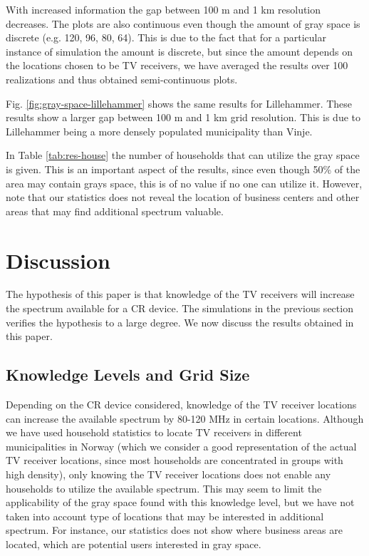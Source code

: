 \documentclass[journal,11pt,draftclsnofoot,onecolumn]{IEEEtran}
\begin{document}
With increased information the gap between 100 m and 1 km resolution decreases. The plots are also continuous even though the amount of gray space is discrete (e.g. 120, 96, 80, 64). This is due to the fact that for a particular instance of simulation the amount is discrete, but since the amount depends on the locations chosen to be TV receivers, we have averaged the results over 100 realizations and thus obtained semi-continuous plots. 

Fig. \ref{fig:gray-space-lillehammer} shows the same results for Lillehammer. These results show a larger gap between 100 m and 1 km grid resolution. This is due to Lillehammer being a more densely populated municipality than Vinje.

In Table \ref{tab:res-house} the number of households that can utilize the gray space is given. This is an important aspect of the results, since even though 50\% of the area may contain grays space, this is of no value if no one can utilize it. However, note that our statistics does not reveal the location of business centers and other areas that may find additional spectrum valuable.

\section{Discussion}
\label{sec:discussion}
The hypothesis of this paper is that knowledge of the TV receivers will increase the spectrum available for a CR device. The simulations in the previous section verifies the hypothesis to a large degree. We now discuss the results obtained in this paper.

\subsection{Knowledge Levels and Grid Size}
Depending on the CR device considered, knowledge of the TV receiver locations can increase the available spectrum by 80-120 MHz in certain locations. Although we have used household statistics to locate TV receivers in different municipalities in Norway (which we consider a good representation of the actual TV receiver locations, since most households are concentrated in groups with high density), only knowing the TV receiver locations does not enable any households to utilize the available spectrum. This may seem to limit the applicability of the gray space found with this knowledge level, but we have not taken into account type of locations that may be interested in additional spectrum. For instance, our statistics does not show where business areas are located, which are potential users interested in gray space.
\end{document}

